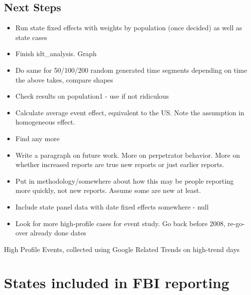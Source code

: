 \documentclass[AER,draftmode]{AEA}
\begin{document}
\clearpage 
\section{Next Steps}

\begin{itemize}
    \item Run state fixed effects with weights by population (once decided) as well as state cases
    \item Finish idt\_analysis. Graph
    \item Do same for 50/100/200 random generated time segments depending on time the above takes, compare shapes
    \item Check results on population1 - use if not ridiculous
    \item Calculate average event effect, equivalent to the US. Note the assumption in homogeneous effect.
    \item Find any more 
    \item Write a paragraph on future work. More on perpetrator behavior. More on whether increased reports are true new reports or just earlier reports.
    \item Put in methodology/somewhere about how this may be people reporting more quickly, not new reports. Assume some are new at least.
    \item Include state panel data with date fixed effects somewhere - null
    \item Look for more high-profile cases for event study. Go back before 2008, re-go-over already done dates
\end{itemize}


\clearpage




\clearpage
\appendix

\begin{table}[]
\caption{High Profile Events, collected using Google Related Trends on high-trend days}

\end{table}

\clearpage
\chapter{States included in FBI reporting}
\end{document}
